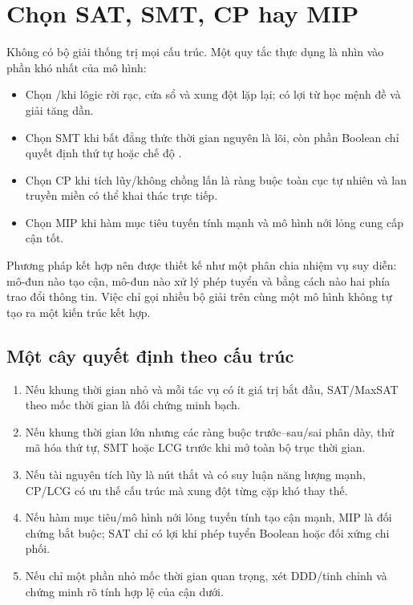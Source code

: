 \section{Chọn SAT, SMT, CP hay MIP}

Không có bộ giải thống trị mọi cấu trúc. Một quy tắc thực dụng là nhìn vào phần
khó nhất của mô hình:
\begin{itemize}
  \item Chọn \SAT/\MaxSAT khi lôgic rời rạc, cửa sổ và xung đột lặp lại; có lợi
        từ học mệnh đề và giải tăng dần.
  \item Chọn SMT khi bất đẳng thức thời gian nguyên là lõi, còn phần Boolean
        chỉ quyết định thứ tự hoặc chế độ \parencite{bofill2020rcpsp}.
  \item Chọn CP khi tích lũy/không chồng lấn là ràng buộc toàn cục tự nhiên và
        lan truyền miền có thể khai thác trực tiếp.
  \item Chọn MIP khi hàm mục tiêu tuyến tính mạnh và mô hình nới lỏng cung cấp cận tốt.
\end{itemize}

Phương pháp kết hợp nên được thiết kế như một phân chia nhiệm vụ suy diễn: mô-đun
nào tạo cận, mô-đun nào xử lý phép tuyển và bằng cách nào hai phía trao đổi
thông tin. Việc chỉ gọi nhiều bộ giải trên cùng một mô hình không tự tạo ra
một kiến trúc kết hợp.

\subsection{Một cây quyết định theo cấu trúc}

\begin{enumerate}
  \item Nếu khung thời gian nhỏ và mỗi tác vụ có ít giá trị bắt đầu, SAT/MaxSAT theo
        mốc thời gian là đối chứng minh bạch.
  \item Nếu khung thời gian lớn nhưng các ràng buộc trước--sau/sai phân dày, thử mã
        hóa thứ tự, SMT hoặc LCG trước khi mở toàn bộ trục thời gian.
  \item Nếu tài nguyên tích lũy là nút thắt và có suy luận năng lượng mạnh,
        CP/LCG có ưu thế cấu trúc mà xung đột từng cặp khó thay thế.
  \item Nếu hàm mục tiêu/mô hình nới lỏng tuyến tính tạo cận mạnh, MIP là đối
        chứng bắt buộc; SAT chỉ có lợi khi phép tuyển Boolean hoặc đối xứng chi phối.
  \item Nếu chỉ một phần nhỏ mốc thời gian quan trọng, xét DDD/tinh chỉnh và
        chứng minh rõ tính hợp lệ của cận dưới.
\end{enumerate}

